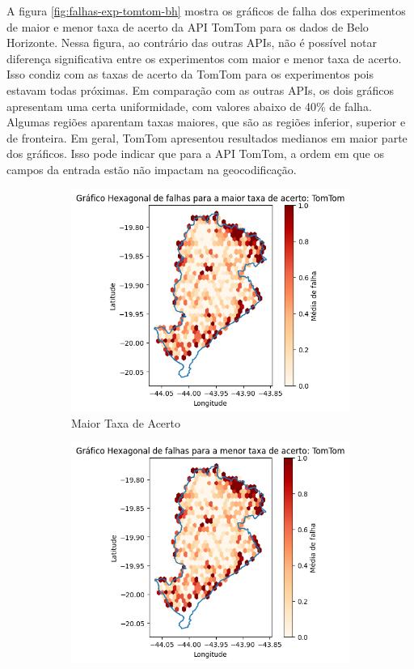 A figura \ref{fig:falhas-exp-tomtom-bh} mostra os gráficos de falha dos experimentos de maior e menor taxa de acerto da API TomTom para os dados de Belo Horizonte. Nessa figura, ao contrário das outras APIs, não é possível notar diferença significativa entre os experimentos com maior e menor taxa de acerto. Isso condiz com as taxas de acerto da TomTom para os experimentos pois estavam todas próximas. Em comparação com as outras APIs, os dois gráficos apresentam uma certa uniformidade, com valores abaixo de 40\% de falha. Algumas regiões aparentam taxas maiores, que são as regiões inferior, superior e de fronteira. Em geral, TomTom apresentou resultados medianos em maior parte dos gráficos. Isso pode indicar que para a API TomTom, a ordem em que os campos da entrada estão não impactam na geocodificação.

\begin{figure}[ht]
  \centering
  \begin{subfigure}[b]{0.45\textwidth}
    \includegraphics[width=\textwidth]{Figuras/expFalhasTomtommaior.png}
    \caption{Maior Taxa de Acerto}
    \label{fig:falhastomtomBHexpMaior}
  \end{subfigure}
  \hfill
  \begin{subfigure}[b]{0.45\textwidth}
    \includegraphics[width=\textwidth]{Figuras/expFalhasTomtommenor.png}

\end{subfigure}
\end{figure}
